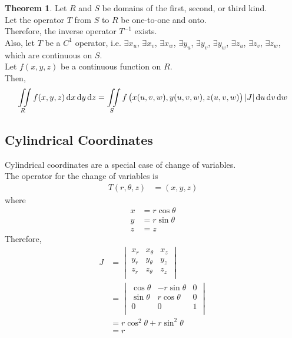 \documentclass[fleqn, a4paper, 12pt, twoside]{article}
\theoremstyle{definition}
\theoremstyle{theorem}
\newtheorem{theorem}{Theorem}
\begin{document}
{\begin{theorem}
	Let $R$ and $S$ be domains of the first, second, or third kind.\\
	Let the operator $T$ from $S$ to $R$ be one-to-one and onto.\\
	Therefore, the inverse operator $T^{-1}$ exists.\\
	Also, let $T$ be a $C^1$ operator, i.e. $\exists x_u$, $\exists x_v$, $\exists x_w$, $\exists y_u$, $\exists y_v$, $\exists y_w$, $\exists z_u$, $\exists z_v$, $\exists z_w$, which are continuous on $S$.\\
	Let $f(x,y,z)$ be a continuous function on $R$.\\
	Then,
	\begin{equation*}
		\iint\limits_{R} f(x,y,z) \dif x \dif y \dif z = \iint\limits_{S} f\left( x(u,v,w), y(u,v,w), z(u,v,w) \right) |J| \dif u \dif v \dif w
	\end{equation*}
\end{theorem}

\subsection{Cylindrical Coordinates}

Cylindrical coordinates are a special case of change of variables.\\
The operator for the change of variables is
\begin{align*}
	T(r,\theta,z) & = (x,y,z)
\end{align*}
where
\begin{align*}
	x & = r \cos \theta \\
	y & = r \sin \theta \\
	z & = z
\end{align*}
Therefore,
\begin{align*}
	J &=
		\begin{vmatrix}
			x_r & x_{\theta} & x_z \\
			y_r & y_{\theta} & y_z \\
			z_r & z_{\theta} & z_z \\
		\end{vmatrix}\\
	  &=
		\begin{vmatrix}
			\cos \theta & -r \sin \theta & 0 \\
			\sin \theta & r \cos \theta  & 0 \\
			0           & 0              & 1 \\
		\end{vmatrix}\\
	  &= r \cos^2 \theta + r \sin^2 \theta\\
	  &= r
\end{align*}

}
\end{document}
